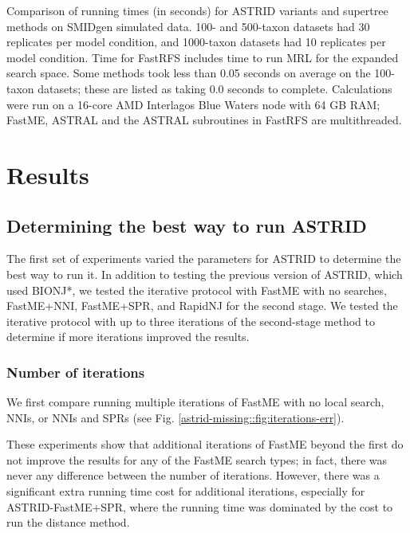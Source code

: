 \begin{table}[htb!]
\begin{adjustbox}{width=1\textwidth}
\end{adjustbox}
     \caption[Running times (in seconds) for ASTRID variants and supertree methods on SMIDgen simulated data]{Comparison of running times (in seconds) for ASTRID variants and supertree methods on SMIDgen simulated data. 100- and 500-taxon datasets had 30 replicates per model condition, and 1000-taxon datasets had 10 replicates per model condition. Time for FastRFS includes time to run MRL for the expanded search space. Some methods took less than 0.05 seconds on average on the 100-taxon datasets; these are listed as taking 0.0 seconds to complete. Calculations were run on a 16-core AMD Interlagos Blue Waters node with 64 GB RAM; FastME, ASTRAL and the ASTRAL subroutines in FastRFS are multithreaded. }
    \label{astrid-missing::tab:runningtimes}
\end{table}
   

\section{Results}


\subsection{Determining the best way to run ASTRID}

The first set of experiments varied the parameters for ASTRID to determine the best way to run it. In addition to testing the previous version of ASTRID, which used BIONJ*, we tested the iterative protocol with FastME with no searches, FastME+NNI, FastME+SPR, and RapidNJ for the second stage. We tested the iterative protocol with up to three iterations of the second-stage method to determine if more iterations improved the results.

\subsubsection{Number of iterations}

We first compare running multiple iterations of FastME with no local search, NNIs, or NNIs and SPRs (see Fig. \ref{astrid-missing::fig:iterations-err}). 

These experiments show that additional iterations of FastME beyond the first do not improve the results for any of the FastME search types; in fact, there was never any difference between the number of iterations. However, there was a significant extra running time cost for additional iterations, especially for ASTRID-FastME+SPR, where the running time was dominated by the cost to run the distance method.

